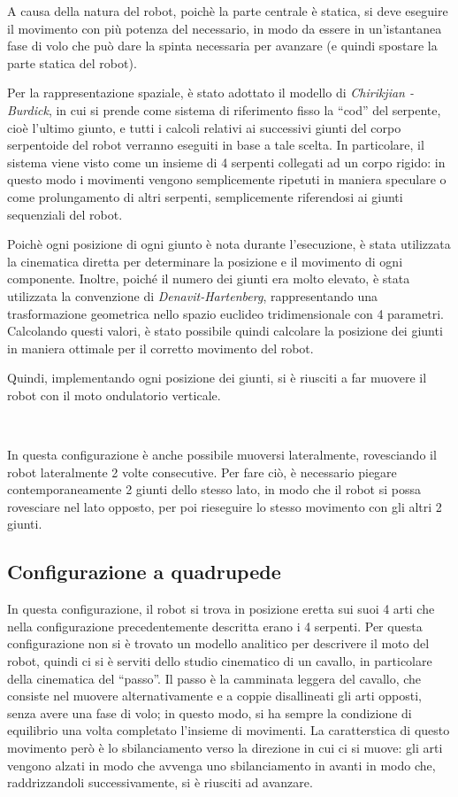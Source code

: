 \documentclass[a4paper,titlepage]{book}
\begin{document}
A causa della natura del robot, poichè la parte centrale è statica, si deve eseguire il movimento con più potenza del necessario, in modo da essere in un'istantanea fase di volo che può dare la spinta necessaria per avanzare (e quindi spostare la parte statica del robot).

Per la rappresentazione spaziale, è stato adottato il modello di \textit{Chirikjian - Burdick}, in cui si prende come sistema di riferimento fisso la ``cod'' del serpente, cioè l’ultimo giunto, e tutti i calcoli relativi ai successivi giunti del corpo serpentoide del robot verranno eseguiti in base a tale scelta. In particolare, il sistema viene visto come un insieme di 4 serpenti collegati ad un corpo rigido:
in questo modo i movimenti vengono semplicemente ripetuti in maniera speculare o come prolungamento di altri serpenti, semplicemente riferendosi ai giunti sequenziali del robot.

Poichè ogni posizione di ogni giunto è nota durante l'esecuzione, è stata utilizzata la cinematica diretta per determinare la posizione e il movimento di ogni componente. Inoltre, poiché il numero dei giunti era molto elevato, è stata utilizzata la convenzione di \textit{Denavit-Hartenberg}, rappresentando una trasformazione geometrica nello spazio euclideo tridimensionale con 4 parametri.
Calcolando questi valori, è stato possibile quindi calcolare la posizione dei giunti in maniera ottimale per il corretto movimento del robot.

Quindi, implementando ogni posizione dei giunti, si è riusciti a far muovere il robot con il moto ondulatorio verticale.

~

In questa configurazione è anche possibile muoversi lateralmente, rovesciando il robot lateralmente 2 volte consecutive. Per fare ciò, è necessario piegare contemporaneamente 2 giunti dello stesso lato, in modo che il robot si possa rovesciare nel lato opposto, per poi rieseguire lo stesso movimento con gli altri 2 giunti.

\subsection{Configurazione a quadrupede}

In questa configurazione, il robot si trova in posizione eretta sui suoi 4 arti che nella configurazione precedentemente descritta erano i 4 serpenti. Per questa configurazione non si è trovato un modello analitico per descrivere il moto del robot, quindi ci si è serviti dello studio cinematico di un cavallo, in particolare della cinematica del ``passo''.
Il passo è la camminata leggera del cavallo, che consiste nel muovere alternativamente e a coppie disallineati gli arti opposti, senza avere una fase di volo; in questo modo, si ha sempre la condizione di equilibrio una volta completato l'insieme di movimenti. La caratterstica di questo movimento però è lo sbilanciamento verso la direzione in cui ci si muove: gli arti vengono alzati in modo che avvenga uno sbilanciamento in avanti in modo che, raddrizzandoli successivamente, si è riusciti ad avanzare.
\end{document}
